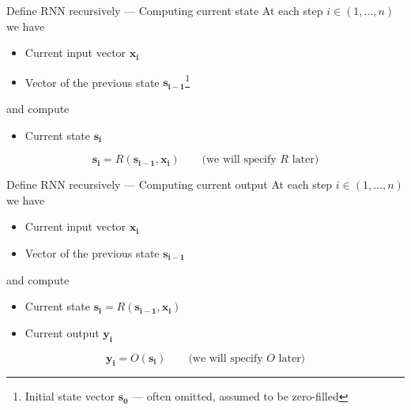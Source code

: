 \documentclass[12pt,aspectratio=169,handout]{beamer}
\begin{document}
\begin{frame}{Define RNN recursively --- Computing current state}
At each step $i \in (1, \ldots, n)$ we have
\begin{itemize}
	\item Current input vector $\bm{x_i}$
	\item Vector of the previous state $\bm{s_{i - 1}}$\footnote{Initial state vector $\bm{s_0}$ --- often omitted, assumed to be zero-filled}
\end{itemize}
and compute
\begin{itemize}
	\item Current state $\bm{s_i}$
\end{itemize}
$$
\bm{s_i} = R(\bm{s_{i-1}}, \bm{x_i}) \qquad \text{(we will specify $R$ later)}
$$

\end{frame}


\begin{frame}{Define RNN recursively --- Computing current output}
At each step $i \in (1, \ldots, n)$ we have
\begin{itemize}
	\item Current input vector $\bm{x_i}$
	\item Vector of the previous state $\bm{s_{i - 1}}$
\end{itemize}
and compute
\begin{itemize}
	\item Current state $\bm{s_i} = R(\bm{s_{i-1}}, \bm{x_i})$
	\item Current output $\bm{y_i}$
\end{itemize}
$$
\bm{y_i} = O(\bm{s_i}) \qquad \text{(we will specify $O$ later)}
$$

\end{frame}
\end{document}
